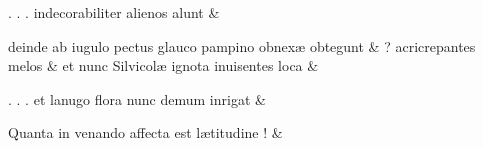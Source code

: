 \documentclass[12pt,onecolumn,twoside,a4paper]{memoir}
\begin{document}
\begin{pairs}
\begin{Leftside}
                              .
                              .
                              .
                              indecorabiliter
                              alienos
                              alunt \&
                         \stanza {}
                     
                              deinde
                              ab
                              iugulo
                              pectus
                              glauco
                              pampino
                              obnexæ
                              obtegunt \&
                         \stanza {}
                     ?
                              acricrepantes
                              melos \&
                         \stanza {}
                     et
                              nunc
                              Silvicolæ
                              ignota
                              inuisentes
                              loca \&
                         \stanza {}
                     
                              .
                              .
                              .
                              et
                              lanugo
                              flora
                              nunc
                              demum
                              inrigat \&
                         \stanza {}
                     
                              Quanta
                              in
                              venando
                              affecta
                              est
                              lætitudine
                              !
                            \&
                     
                  \endnumbering
		\end{Leftside}
                  \begin{Rightside}
			\beginnumbering
			\numberstanzafalse
                     

\end{Rightside}
\end{pairs}
\end{document}
